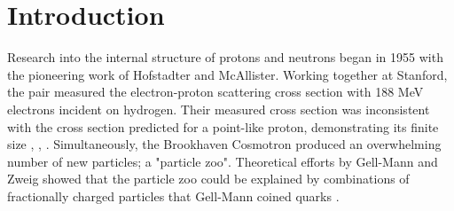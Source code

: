

%


% 


\chapter{Introduction}
Research into the internal structure of protons and neutrons began in 1955 with the pioneering work of Hofstadter and McAllister.  Working together at Stanford, the pair measured the electron-proton scattering cross section with 188 MeV electrons incident on hydrogen. Their measured cross section was inconsistent with the cross section predicted for a point-like proton, demonstrating its finite size \cite{history-hofstadter:1955}, \cite{history-hofstadter:1956}, \cite{history-chambers:1956}.  Simultaneously, the Brookhaven Cosmotron produced an overwhelming number of new particles; a "particle zoo".  Theoretical efforts by Gell-Mann and Zweig showed that the particle zoo could be explained by combinations of fractionally charged particles that Gell-Mann coined quarks \cite{history-zweig:1964}.  

